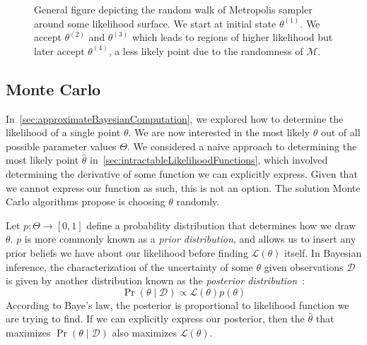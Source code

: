 \begin{figure}[t]
    \centering{}
    \caption{General figure depicting the random walk of Metropolis sampler around some likelihood surface.
    We start at initial state $\theta^{(1)}$.
    We accept $\theta^{(2)}$ and $\theta^{(3)}$ which leads to regions of higher likelihood but later accept
    $\theta^{(4)}$, a less likely point due to the randomness of $\mathcal{M}$.
    }\label{fig:metropolisAlgorithm}
\end{figure}

\subsection{Monte Carlo}\label{subsec:monteCarlo}
In~\autoref{sec:approximateBayesianComputation}, we explored how to determine the likelihood of a single point $\theta$.
We are now interested in the most likely $\theta$ out of all possible parameter values $\Theta$.
We considered a naive approach to determining the most likely point $\hat{\theta}$
in~\autoref{sec:intractableLikelihoodFunctions}, which involved determining the derivative of some function we can
explicitly express.
Given that we cannot express our function as such, this is not an option.
The solution Monte Carlo algorithms propose is choosing $\theta$ randomly.

Let $p : \Theta \rightarrow [0, 1]$ define a probability distribution that determines how we draw $\theta$.
$p$ is more commonly known as a \emph{prior distribution}, and allows us to insert any prior beliefs we have about our
likelihood before finding $\mathcal{L}(\theta)$ itself.
In Bayesian inference, the characterization of the uncertainty of some $\theta$ given observations $\mathcal{D}$ is
given by another distribution known as the
\emph{posterior distribution}~\cite{lintusaariFundamentalsRecentDevelopments2017}:
\begin{equation}
    \Pr(\theta \mid \mathcal{D}) \propto \mathcal{L}(\theta) p(\theta)
\end{equation}
According to Baye's law, the posterior is proportional to likelihood function we are trying to find.
If we can explicitly express our posterior, then the $\hat{\theta}$ that maximizes $\Pr(\theta \mid \mathcal{D})$ also
maximizes $\mathcal{L}(\theta)$.

